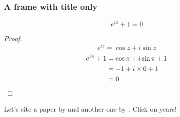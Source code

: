 \documentclass{beamer}
\begin{document}
\begin{frame}
      \frametitle{A frame with title only}
      \begin{theorem}
            \[e^{i\pi}+1=0\]
            \begin{proof}
                  \begin{equation*}
                        e^{iz}=\cos{z}+i\sin{z}
                  \end{equation*}
                  \begin{align*}
                        e^{i\pi}+1 & \null=\cos\pi+i\sin\pi+1 \\
                                   & \null=-1+i\times0+1      \\
                                   & \null=0
                  \end{align*}
            \end{proof}
      \end{theorem}
      Let's cite a paper by \cite{amiot_2007_structure_triangulated_categories} and another one by \cite{bergh_jasso_thaule_2016_higher_angulations_local}. \alert{Click on years!}
\end{frame}
\end{document}
